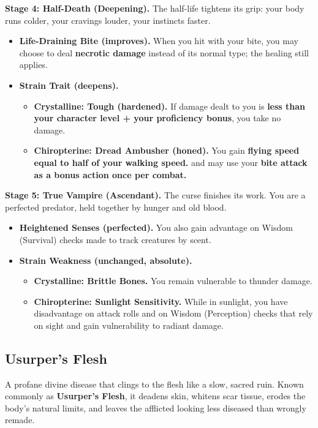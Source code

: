 \documentclass{apotheosis-book}
\begin{document}
\textbf{Stage 4: Half-Death (Deepening).}
The half-life tightens its grip: your body runs colder, your cravings louder, your instincts faster.
\begin{itemize}
\item \textbf{Life-Draining Bite (improves).} When you hit with your bite, you may choose to deal \textbf{necrotic damage} instead of its normal type; the healing still applies.
\item \textbf{Strain Trait (deepens).}
\begin{itemize}
\item \textbf{Crystalline: Tough (hardened).} If damage dealt to you is \textbf{less than your character level + your proficiency bonus}, you take no damage.
\item \textbf{Chiropterine: Dread Ambusher (honed).} You gain \textbf{flying speed equal to half of your walking speed.} and may use your \textbf{bite attack as a bonus action once per combat.}
\end{itemize}
\end{itemize}

\textbf{Stage 5: True Vampire (Ascendant).}
The curse finishes its work. You are a perfected predator, held together by hunger and old blood.
\begin{itemize}
\item \textbf{Heightened Senses (perfected).} You also gain advantage on Wisdom (Survival) checks made to track creatures by scent.
\item \textbf{Strain Weakness (unchanged, absolute).}
\begin{itemize}
\item \textbf{Crystalline: Brittle Bones.} You remain vulnerable to thunder damage.
\item \textbf{Chiropterine: Sunlight Sensitivity.} While in sunlight, you have disadvantage on attack rolls and on Wisdom (Perception) checks that rely on sight and gain vulnerability to radiant damage.
\end{itemize}
\end{itemize}

\subsection{Usurper's Flesh}

A profane divine disease that clings to the flesh like a slow, sacred ruin. Known commonly as \textbf{Usurper's Flesh}, it deadens skin, whitens scar tissue, erodes the body's natural limits, and leaves the afflicted looking less diseased than wrongly remade.
\end{document}
